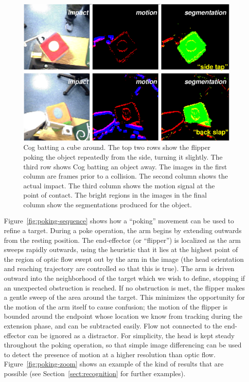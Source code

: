 \ifverbose
%
\begin{figure}[tb]
\begin{center}
\includegraphics[width=12cm]{segmentation-detail.eps}
\caption{ 
%
Cog batting a cube around.  The top two rows show the flipper poking
the object repeatedly from the side, turning it slightly.  The third
row shows Cog batting an object away.  The images in the first column
are frames prior to a collision.  The second column shows the actual
impact.  The third column shows the motion signal at the point of
contact.  The bright regions in the images in the final column show
the segmentations produced for the object. 
%
}
\label{fig:poking-segmentation}
\end{center}
\end{figure}
%
\fi

Figure~\ref{fig:poking-sequence} shows how a ``poking'' movement can
be used to refine a target.  During a poke operation, the arm begins
by extending outwards from the resting position.  The end-effector (or
``flipper'') is localized as the arm sweeps rapidly outwards, using
the heuristic that it lies at the highest point of the region of optic
flow swept out by the arm in the image (the head orientation and
reaching trajectory are controlled so that this is true).  The arm is
driven outward into the neighborhood of the target which we wish to
define, stopping if an unexpected obstruction is reached.  If no
obstruction is met, the flipper makes a gentle sweep of the area
around the target.  This minimizes the opportunity for the motion of
the arm itself to cause confusion; the motion of the flipper is
bounded around the endpoint whose location we know from tracking
during the extension phase, and can be subtracted easily.  Flow not
connected to the end-effector can be ignored as a distractor.  
For simplicity, the head is kept steady throughout the poking
operation, so that simple image differencing can be used to detect
the presence of motion at a higher resolution than optic flow.
Figure~\ref{fig:poking-zoom} shows an example of the kind of 
results that are possible (see Section~\ref{sect:recognition} for 
further examples).

